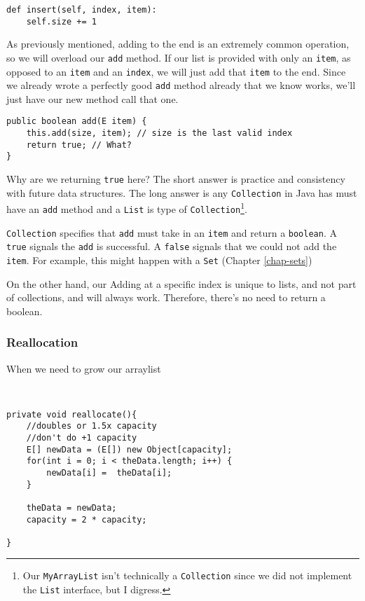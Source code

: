 \begin{verbatim}
def insert(self, index, item):
	self.size += 1

\end{verbatim}



As previously  mentioned, adding to the end is an extremely common operation, so we will overload our \texttt{add} method.
If our list is provided with only an \texttt{item}, as opposed to an \texttt{item} and an \texttt{index}, we will just add that \texttt{item} to the end.
Since we already wrote a perfectly good \texttt{add} method already that we know works, we'll just have our new method call that one.
\begin{verbatim}
public boolean add(E item) {
	this.add(size, item); // size is the last valid index
	return true; // What?
}
\end{verbatim}

Why are we returning \texttt{true} here?
The short answer is practice and consistency with future data structures.
The long answer is any \texttt{Collection} in Java has must have an \texttt{add} method and a \texttt{List} is type of \texttt{Collection}\footnote{Our \texttt{MyArrayList} isn't technically a \texttt{Collection} since we did not implement the \texttt{List} interface, but I digress.}.

\texttt{Collection} specifies that \texttt{add} must take in an \texttt{item} and return a \texttt{boolean}.
A \texttt{true} signals the \texttt{add} is successful.
A \texttt{false} signals that we could not add the \texttt{item}.
For example, this might happen with a \texttt{Set} (Chapter \ref{chap-sets})


On the other hand, our Adding at a specific index is unique to lists, and not part of collections,  and will always work. Therefore, there's no need to return a boolean. 

\subsubsection{Reallocation}
\label{arraylist-reallocate}
When we need to grow our arraylist
\begin{verbatim}


private void reallocate(){
	//doubles or 1.5x capacity
	//don't do +1 capacity
	E[] newData = (E[]) new Object[capacity];
	for(int i = 0; i < theData.length; i++) {
		newData[i] =  theData[i];
	}
	
	theData = newData;
	capacity = 2 * capacity;
	
}
\end{verbatim}

